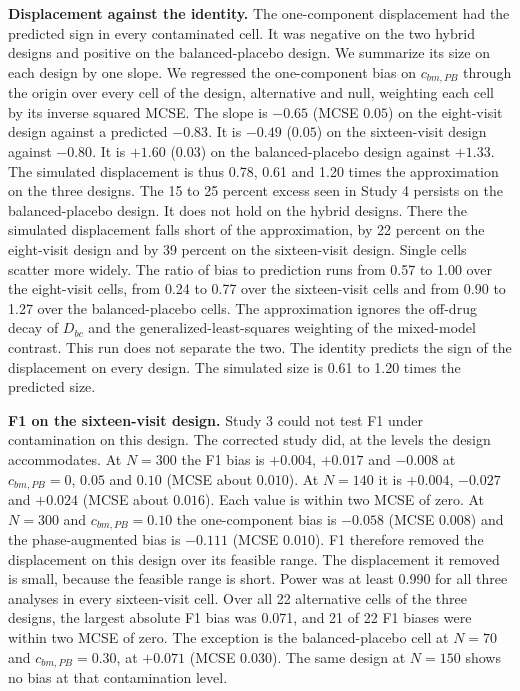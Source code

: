 \documentclass[
  11pt,
]{article}
\begin{document}
\textbf{Displacement against the identity.} The one-component displacement
had the predicted sign in every contaminated cell. It was negative on
the two hybrid designs and positive on the balanced-placebo design. We
summarize its size on each design by one slope. We regressed the
one-component bias on \(c_{bm,PB}\) through the origin over every cell of
the design, alternative and null, weighting each cell by its inverse
squared MCSE. The slope is \(-0.65\) (MCSE
\(0.05\)) on the eight-visit design against a predicted
\(-0.83\). It is \(-0.49\)
(\(0.05\)) on the sixteen-visit design against
\(-0.80\). It is \(+1.60\)
(\(0.03\)) on the balanced-placebo design against
\(+1.33\). The simulated displacement is thus
0.78, 0.61 and 1.20
times the approximation on the three designs. The 15 to 25 percent
excess seen in Study 4 persists on the balanced-placebo design. It does
not hold on the hybrid designs. There the simulated displacement falls
short of the approximation, by 22 percent
on the eight-visit design and by 39
percent on the sixteen-visit design. Single cells
scatter more widely. The ratio of bias to prediction runs from
0.57 to
1.00 over the eight-visit cells, from
0.24 to
0.77 over the sixteen-visit cells and
from 0.90 to
1.27 over the balanced-placebo cells.
The approximation ignores the off-drug decay of \(D_{bc}\) and the
generalized-least-squares weighting of the mixed-model contrast. This
run does not separate the two. The identity predicts the sign of the
displacement on every design. The simulated size is
0.61 to
1.20 times the predicted
size.

\textbf{F1 on the sixteen-visit design.} Study 3 could not test F1 under
contamination on this design. The corrected study did, at the levels
the design accommodates. At \(N = 300\) the F1 bias is
\(+0.004\),
\(+0.017\) and
\(-0.008\) at \(c_{bm,PB} = 0\),
\(0.05\) and \(0.10\) (MCSE about
\(0.010\)). At \(N = 140\)
it is \(+0.004\),
\(-0.027\) and
\(+0.024\) (MCSE about
\(0.016\)). Each value is
within two MCSE of zero. At \(N = 300\) and \(c_{bm,PB} = 0.10\) the
one-component bias is
\(-0.058\) (MCSE
\(0.008\)) and
the phase-augmented bias is
\(-0.111\) (MCSE
\(0.010\)).
F1 therefore removed the displacement on this design over its feasible
range. The displacement it removed is small, because the feasible range
is short. Power was at least
0.990 for all three analyses in
every sixteen-visit cell. Over all 22 alternative cells of the three
designs, the largest absolute F1 bias was 0.071, and
21 of 22 F1 biases were within two MCSE of zero. The
exception is the balanced-placebo cell at \(N = 70\) and
\(c_{bm,PB} = 0.30\), at
\(+0.071\) (MCSE \(0.030\)). The
same design at \(N = 150\) shows no bias at that contamination level.
\end{document}
